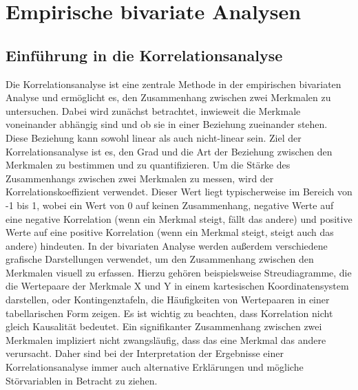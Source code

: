 \chapter{Empirische bivariate Analysen}
\section{Einführung in die Korrelationsanalyse}
Die Korrelationsanalyse ist eine zentrale Methode in der empirischen bivariaten Analyse und ermöglicht es, den Zusammenhang zwischen zwei Merkmalen zu untersuchen.
Dabei wird zunächst betrachtet, inwieweit die Merkmale voneinander abhängig sind und ob sie in einer Beziehung zueinander stehen.
Diese Beziehung kann sowohl linear als auch nicht-linear sein.
Ziel der Korrelationsanalyse ist es, den Grad und die Art der Beziehung zwischen den Merkmalen zu bestimmen und zu quantifizieren.
\newline \newline
Um die Stärke des Zusammenhangs zwischen zwei Merkmalen zu messen, wird der Korrelationskoeffizient verwendet.
Dieser Wert liegt typischerweise im Bereich von -1 bis 1, wobei ein Wert von 0 auf keinen Zusammenhang, negative Werte auf eine negative Korrelation (wenn ein Merkmal steigt, fällt das andere) und positive Werte auf eine positive Korrelation (wenn ein Merkmal steigt, steigt auch das andere) hindeuten.
\newline \newline
In der bivariaten Analyse werden außerdem verschiedene grafische Darstellungen verwendet, um den Zusammenhang zwischen den Merkmalen visuell zu erfassen.
Hierzu gehören beispielsweise Streudiagramme, die die Wertepaare der Merkmale X und Y in einem kartesischen Koordinatensystem darstellen, oder Kontingenztafeln, die Häufigkeiten von Wertepaaren in einer tabellarischen Form zeigen.
\newline \newline
Es ist wichtig zu beachten, dass Korrelation nicht gleich Kausalität bedeutet.
Ein signifikanter Zusammenhang zwischen zwei Merkmalen impliziert nicht zwangsläufig, dass das eine Merkmal das andere verursacht.
Daher sind bei der Interpretation der Ergebnisse einer Korrelationsanalyse immer auch alternative Erklärungen und mögliche Störvariablen in Betracht zu ziehen.
